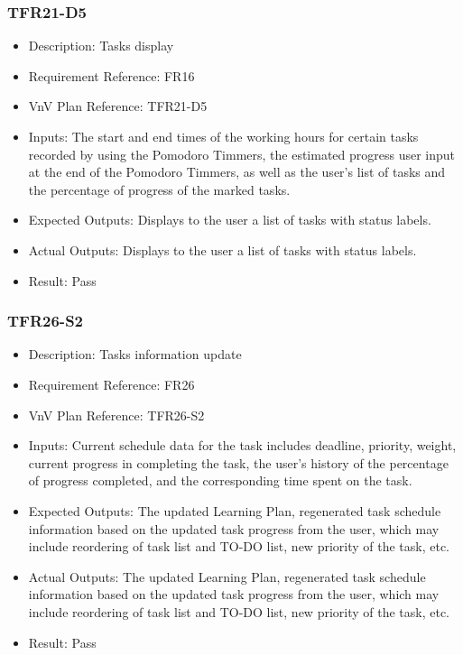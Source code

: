 \documentclass[12pt, titlepage]{article}
\begin{document}
\subsubsection{TFR21-D5}\label{3.2.15}
\begin{itemize}
    \item Description: Tasks display
    \item Requirement Reference: FR16
    \item VnV Plan Reference: TFR21-D5
    \item Inputs: The start and end times of the working hours for certain tasks recorded
by using the Pomodoro Timmers, the estimated progress user input at
the end of the Pomodoro Timmers, as well as the user’s list of tasks and the
percentage of progress of the marked tasks.
    \item Expected Outputs: Displays to the user a list of tasks with status labels.
    \item Actual Outputs: Displays to the user a list of tasks with status labels.
    \item Result: Pass
\end{itemize}


\subsubsection{TFR26-S2}\label{3.2.16}
\begin{itemize}
    \item Description: Tasks information update
    \item Requirement Reference: FR26
    \item VnV Plan Reference: TFR26-S2
    \item Inputs: Current schedule data for the task includes deadline, priority, weight,
current progress in completing the task, the user’s history of the percentage of
progress completed, and the corresponding time spent on the task.
    \item Expected Outputs: The updated Learning Plan, regenerated task schedule information
based on the updated task progress from the user, which may include reordering
of task list and TO-DO list, new priority of the task, etc.
    \item Actual Outputs: The updated Learning Plan, regenerated task schedule information
based on the updated task progress from the user, which may include reordering
of task list and TO-DO list, new priority of the task, etc.
    \item Result: Pass
\end{itemize}
\end{document}
